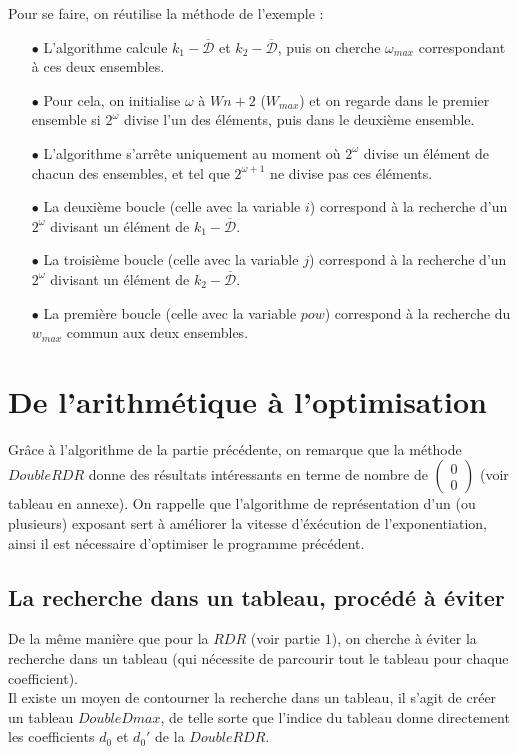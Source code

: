 \documentclass[12pt, a4paper]{memoir}
\newcommand{\doublezero}{\begin{pmatrix} 0 \\ 0 \end{pmatrix}}
\newcommand{\dbarre}{\overline{\mathcal{D}}}
\begin{document}
Pour se faire, on réutilise la méthode de l'exemple : \\
\begin{itemize}
 \item [$\bullet$] L'algorithme calcule $k_1 - \dbarre$ et $k_2 - \dbarre$, puis on cherche $\omega_{max}$ correspondant à ces deux ensembles.
 \item [$\bullet$] Pour cela, on initialise $\omega$ à $Wn+2$ ($W_{max}$) et on regarde dans le premier ensemble si $2^\omega$ divise l'un des éléments,
 puis dans le deuxième ensemble.
 \item [$\bullet$] L'algorithme s'arrête uniquement au moment où $2^\omega$ divise un élément de chacun des ensembles, et tel que $2^{\omega + 1}$
 ne divise pas ces éléments.
 \item [$\bullet$] La deuxième boucle (celle avec la variable $i$) correspond à la recherche d'un $2^\omega$ divisant un élément de $k_1 - \dbarre$.
 \item [$\bullet$] La troisième boucle (celle avec la variable $j$) correspond à la recherche d'un $2^\omega$ divisant un élément de $k_2 - \dbarre$.
 \item [$\bullet$] La première boucle (celle avec la variable $pow$) correspond à la recherche du $w_{max}$ commun aux deux ensembles.
 \end{itemize}

 \section{De l'arithmétique à l'optimisation}
   
Grâce à l'algorithme de la partie précédente, on remarque que la méthode $DoubleRDR$ donne des résultats 
intéressants en terme de nombre de $\doublezero$ (voir tableau en annexe).
On rappelle que l'algorithme de représentation d'un (ou plusieurs) exposant sert à améliorer la vitesse d'éxécution de
l'exponentiation, ainsi il est nécessaire d'optimiser le programme précédent.

    \subsection{La recherche dans un tableau, procédé à éviter}
    
      De la même manière que pour la $RDR$ (voir partie $1$), on cherche à éviter la recherche dans un tableau (qui nécessite
      de parcourir tout le tableau pour chaque coefficient). \\
      Il existe un moyen de contourner la recherche dans un tableau, il s'agit de créer un tableau $DoubleDmax$, 
      de telle sorte que l'indice du tableau donne directement les coefficients $d_0$ et $d_0'$ de la $DoubleRDR$.
	    
\end{document}
